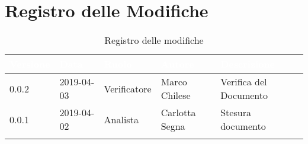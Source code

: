 \newpage

\section*{Registro delle Modifiche}

\begin{center}
\begin{longtable}[c]{|m{}|m{}|m{}|m{}|p{}|}
\hline
\rowcolor{bluelogo}\textbf{\textcolor{white}{Versione}} & \textbf{\textcolor{white}{Data}} & \textbf{\textcolor{white}{Ruolo}} & \textbf{\textcolor{white}{Autore}} & \textbf{\textcolor{white}{Descrizione}}\\
\hline \hline
\endfirsthead
\rowcolor{grigio} 0.0.2 & 2019-04-03 & Verificatore & Marco Chilese & Verifica del Documento \\
\hline
0.0.1 & 2019-04-02 & Analista & Carlotta Segna & Stesura documento \\
\hline
\caption{Registro delle modifiche}
\end{longtable}
\end{center}

